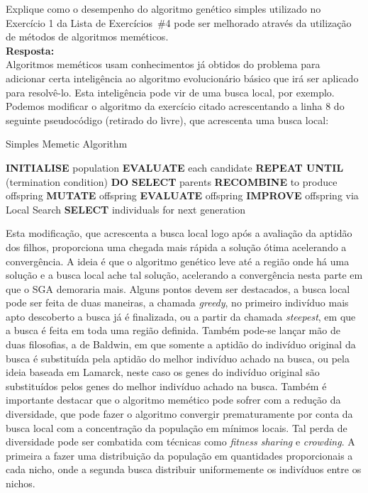 \documentclass{homeworkclass}
\begin{document}
\begin{homeworkProblem}
Explique como o desempenho do algoritmo genético simples utilizado no Exercício 1 da Lista de Exercícios~\#4 pode ser melhorado através da utilização de métodos de algoritmos meméticos.  \\

\textbf{Resposta:} \\
Algoritmos meméticos usam conhecimentos já obtidos do problema para adicionar certa inteligência ao algoritmo evolucionário básico que irá ser aplicado para resolvê-lo. Esta inteligência pode vir de uma busca local, por exemplo. Podemos modificar o algoritmo da exercício citado acrescentando a linha 8 do seguinte pseudocódigo (retirado do livre), que acrescenta uma busca local:

\begin{algorithm}
	\caption{Simples Memetic Algorithm}\label{euclid}
	\begin{algorithmic}[1]
		\State \textbf{INITIALISE} population
		\State \textbf{EVALUATE} each candidate
		\State \textbf{REPEAT UNTIL} (termination condition) \textbf{DO}
		\State \quad \textbf{SELECT} parents
		\State \quad \textbf{RECOMBINE} to produce offspring
		\State \quad \textbf{MUTATE} offspring
		\State \quad \textbf{EVALUATE} offspring
		\State \quad \textbf{IMPROVE} offspring via Local Search
		\State \quad \textbf{SELECT} individuals for next generation
	\end{algorithmic}
\end{algorithm}
Esta modificação, que acrescenta a busca local logo após a avaliação da aptidão dos filhos, proporciona uma chegada mais rápida a solução ótima acelerando a convergência. A ideia é que o algoritmo genético leve até a região onde há uma solução e a busca local ache tal solução, acelerando a convergência nesta parte em que o SGA demoraria mais. 
Alguns pontos devem ser destacados, a busca local pode ser feita de duas maneiras, a chamada \textit{greedy}, no primeiro indivíduo mais apto descoberto a busca já é finalizada, ou a partir da chamada \textit{steepest}, em que a busca é feita em toda uma região definida. Também pode-se lançar mão de duas filosofias, a de Baldwin, em que somente a aptidão do indivíduo original da busca é substituída pela aptidão do melhor indivíduo achado na busca, ou pela ideia baseada em Lamarck, neste caso os genes do indivíduo original são substituídos pelos genes do melhor indivíduo achado na busca. 	
Também é importante destacar que o algoritmo memético pode sofrer com a redução da diversidade, que pode fazer o algoritmo convergir prematuramente por conta da busca local com a concentração da população em mínimos locais. Tal perda de diversidade pode ser combatida com técnicas como \textit{fitness sharing} e \textit{crowding}. A primeira a fazer uma distribuição da população em quantidades proporcionais a cada nicho, onde a segunda busca distribuir uniformemente os indivíduos entre os nichos.   


\end{homeworkProblem}
\end{document}
